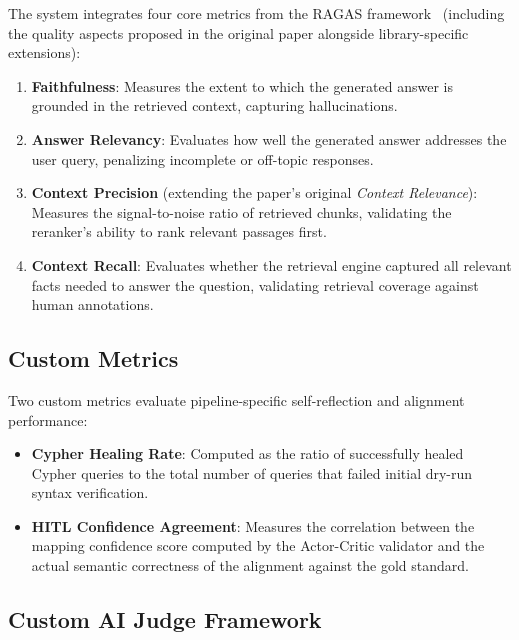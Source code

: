 The system integrates four core metrics from the RAGAS framework~\cite{es2025ragasautomatedevaluationretrieval} (including the quality aspects proposed in the original paper alongside library-specific extensions):
\begin{enumerate}
    \item \textbf{Faithfulness}: Measures the extent to which the generated answer is grounded in the retrieved context, capturing hallucinations.
    \item \textbf{Answer Relevancy}: Evaluates how well the generated answer addresses the user query, penalizing incomplete or off-topic responses.
    \item \textbf{Context Precision} (extending the paper's original \emph{Context Relevance}): Measures the signal-to-noise ratio of retrieved chunks, validating the reranker's ability to rank relevant passages first.
    \item \textbf{Context Recall}: Evaluates whether the retrieval engine captured all relevant facts needed to answer the question, validating retrieval coverage against human annotations.
\end{enumerate}

\subsection{Custom Metrics}
\label{sec:eval:custom_metrics}

Two custom metrics evaluate pipeline-specific self-reflection and alignment performance:
\begin{itemize}
    \item \textbf{Cypher Healing Rate}: Computed as the ratio of successfully healed Cypher queries to the total number of queries that failed initial dry-run syntax verification.
    \item \textbf{HITL Confidence Agreement}: Measures the correlation between the mapping confidence score computed by the Actor-Critic validator and the actual semantic correctness of the alignment against the gold standard.
\end{itemize}

\subsection{Custom AI Judge Framework}
\label{sec:eval:ai_judge}

